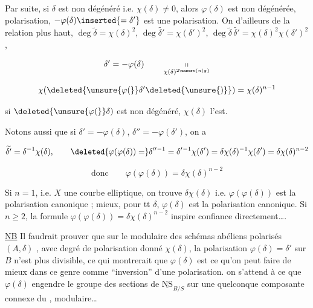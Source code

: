 Par suite, si $\delta$ est non dégénéré i.e. $\chi(\delta)\ne0$, alors $\varphi(\delta)$ est non dégénérée,   polarisation, $-\varphi(\delta)\inserted{=\delta'}$ est une polarisation. On  d'ailleurs de la relation plus haut,  $\deg\widetilde\delta=\chi(\delta)^2$, $\deg\widetilde{\delta'}=\chi(\delta')^2$, $\deg\widetilde\delta\,\widetilde{\delta'}=\chi(\delta)^2\chi(\delta')^2$,

\[
\delta'=-\varphi(\delta)\qquad\underset{\chi(\delta)^{2\unsure{n|g}}}{\shortparallel}
\]


\[
\chi(\deleted{\unsure{\varphi(}}\delta'\deleted{\unsure{)}})=\chi(\delta)^{n-1}
\]

si $\deleted{\unsure{\varphi(}}\delta)$ est non dégénéré,  $\chi(\delta)$ l'est.

Notons aussi que si $\delta'=-\varphi(\delta)$, $\delta''=-\varphi(\delta')$, on a

\[
\widetilde{\delta'}=\delta^{-1}\chi(\delta),\qquad
\deleted{\varphi(\varphi(\delta))=}\delta''{}^{-1}=\delta'{}^{-1}\chi(\delta')=\delta\chi(\delta)^{-1}\chi(\delta')=\delta\chi(\delta)^{n-2}
\]

\[
\text{donc}\qquad\varphi(\varphi(\delta))=\delta\chi(\delta)^{n-2}
\]

Si  $n=1$, i.e. $X$ une courbe elliptique, on trouve  $\delta\chi(\delta)$ i.e. $\varphi(\varphi(\delta))$ est la polarisation canonique ; \deleted{[NB $\varphi($} mieux, pour tt $\delta$, $\varphi(\delta)$ est la polarisation canonique. Si $n\geq2$, la formule $\varphi(\varphi(\delta))=\delta\chi(\delta)^{n-2}$ inspire confiance directement\ldots.

\uline{NB} Il faudrait prouver que sur le    modulaire des schémas abéliens polarisés $(A,\delta)$ , avec degré de polarisation donné $\chi(\delta)$, la polarisation $\varphi(\delta)=\delta'$  sur $B$ n'est plus divisible,  ce qui montrerait que $\varphi(\delta)$ est ce qu'on peut faire de mieux dans ce genre comme ``inversion'' d'une polarisation.   on s'attend à ce que $\varphi(\delta)$ engendre le groupe  des sections de $\underline{\mathrm{NS}}_{B/S}$ sur une quelconque composante connexe du   , modulaire\ldots
{}

